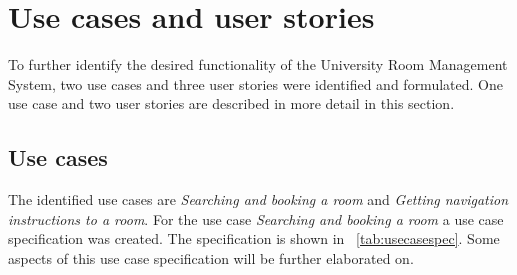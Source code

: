 \documentclass[article,onecolumn]{IEEEtran}
\begin{document}
\section{Use cases and user stories}

To further identify the desired functionality of the University Room Management System, two use cases and three user stories were identified and formulated.
One use case and two user stories are described in more detail in this section.

\subsection{Use cases}

The identified use cases are \emph{Searching and booking a room} and \emph{Getting navigation instructions to a room}.
For the use case \emph{Searching and booking a room} a use case specification was created. The specification is shown in \tablename~\ref{tab:usecasespec}. Some aspects of this use case specification will be further elaborated on.
\end{document}
